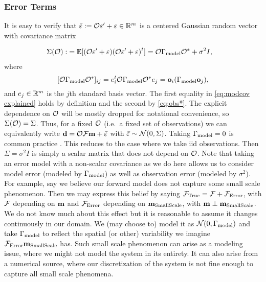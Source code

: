 \subsubsection{Error Terms}
It is easy to verify that $\bar{\varepsilon} := \mathcal{O} \varepsilon' + \varepsilon \in \mathbb{R}^m$
is a centered Gaussian random vector with covariance
matrix

\begin{align}\label{eq:Sigma}
  \begin{split}
    \Sigma(\obs) :&= \mathbb{E}[ (\obs \eps' + \eps) (\obs \eps' +
      \eps)^t ]
    = \obs \modcov \obs^* + \sigma^2I , 
  \end{split}
\end{align}
where
\begin{equation}\label{eq:modcov explained}
  [\obs \modcov \obs^*]_{ij} = e_i^t \obs \modcov \obs^* e_j = \meas_i (\modcov \meas_j),
\end{equation}
and $e_j \in \mathbb{R}^m$ is the $j$th standard basis vector. The first
equality in \eqref{eq:modcov explained} holds by definition and the
second by \eqref{eq:obs*}. The explicit dependence on $\mathcal{O}$ will be
mostly dropped for notational convenience, so $\Sigma(\mathcal{O}) =
\Sigma$. Thus, for a fixed $\mathcal{O}$ (i.e.\ a fixed set of observations)
we can equivalently write $\mathbf{d} = \mathcal{O} \mathcal{F} \mathbf{m} + \bar{\varepsilon}$ with
$\bar{\varepsilon} \sim \mathcal{N}(0,\Sigma)$. Taking $\Gamma_{\textup{model}} = 0$ is common
practice \cite{Tarantola05,Kaipio2006,Vogel02}. This reduces to the
case where we take iid observations. Then $\Sigma = \sigma^2I$ is
simply a scalar matrix that does not depend on $\mathcal{O}$. Note that
taking an error model with a non-scalar covariance as we do here
allows us to consider model error (modeled by $\Gamma_{\textup{model}}$) as well as
observation error (modeled by $\sigma^2$). For example, say we believe
our forward model does not capture some small scale phenomenon.  Then
we may express this belief by saying $\mathcal{F}_{\textup{True}} = \mathcal{F} + \mathcal{F}_{\textup{Error}}$, with $\mathcal{F}$
depending on $\mathbf{m}$ and $\mathcal{F}_{\textup{Error}}$ depending on $\mathbf{m}_{\textup{SmallScale}}$, with $\mathbf{m}
\perp \mathbf{m}_{\textup{SmallScale}}$. We do not know much about this effect but it is
reasonable to assume it changes continuously in our domain. We (may
choose to) model it as $\mathcal{N} (0, \Gamma_{\textup{model}})$ and take $\Gamma_{\textup{model}}$ to
reflect the spatial (or other) variability we imagine $\mathcal{F}_{\textup{Error}} \mathbf{m}_{\textup{SmallScale}}$
has. Such small scale phenomenon can arise as a modeling issue, where
we might not model the system in its entirety. It can also arise from
a numerical source, where our discretization of the system is not fine
enough to capture all small scale phenomena.

